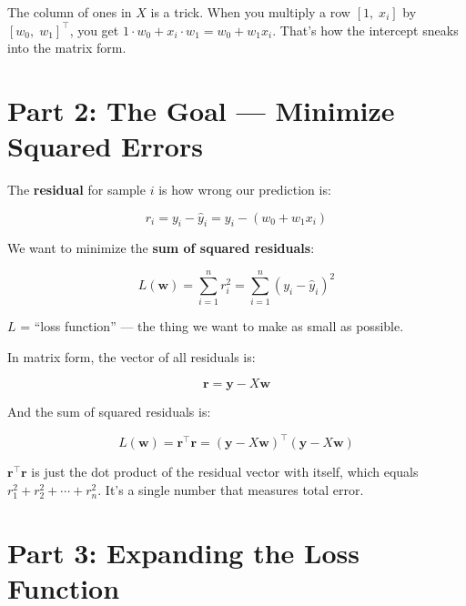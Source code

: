 \documentclass[11pt, a4paper]{article}
\newcommand{\gut}[1]{\begin{tcolorbox}[colback=lightyellow, colframe=orange!50, title=Gut feeling]#1\end{tcolorbox}}
\begin{document}
\gut{
The column of ones in $X$ is a trick. When you multiply a row $[1, \; x_i]$ by $[w_0, \; w_1]^\top$, you get $1 \cdot w_0 + x_i \cdot w_1 = w_0 + w_1 x_i$. That's how the intercept sneaks into the matrix form.
}


\section*{\color{secblue}Part 2: The Goal --- Minimize Squared Errors}

The \textbf{residual} for sample $i$ is how wrong our prediction is:

\begin{equation}
r_i = y_i - \hat{y}_i = y_i - (w_0 + w_1 x_i)
\tag{OLS-4}
\end{equation}

We want to minimize the \textbf{sum of squared residuals}:

\begin{equation}
L(\mathbf{w}) = \sum_{i=1}^{n} r_i^2 = \sum_{i=1}^{n} (y_i - \hat{y}_i)^2
\tag{OLS-5}
\end{equation}

\begin{center}
$L$ = ``loss function'' --- the thing we want to make as small as possible.
\end{center}

In matrix form, the vector of all residuals is:

\begin{equation}
\mathbf{r} = \mathbf{y} - X\mathbf{w}
\tag{OLS-6}
\end{equation}

And the sum of squared residuals is:

\begin{equation}
L(\mathbf{w}) = \mathbf{r}^\top \mathbf{r} = (\mathbf{y} - X\mathbf{w})^\top (\mathbf{y} - X\mathbf{w})
\tag{OLS-7}
\end{equation}

\gut{
$\mathbf{r}^\top \mathbf{r}$ is just the dot product of the residual vector with itself, which equals $r_1^2 + r_2^2 + \cdots + r_n^2$. It's a single number that measures total error.
}


\section*{\color{secblue}Part 3: Expanding the Loss Function}
\end{document}
